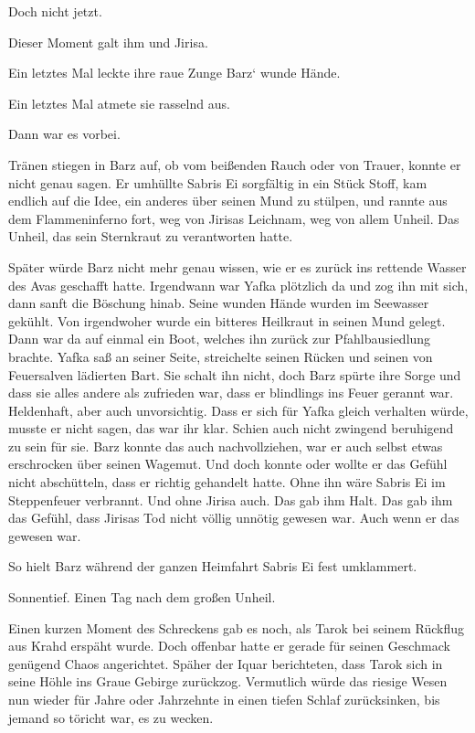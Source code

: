 Doch nicht jetzt.

Dieser Moment galt ihm und Jirisa.

Ein letztes Mal leckte ihre raue Zunge Barz‘ wunde Hände.

Ein letztes Mal atmete sie rasselnd aus.

Dann war es vorbei.

Tränen stiegen in Barz auf, ob vom beißenden Rauch oder von Trauer, konnte er nicht genau sagen. Er umhüllte Sabris Ei sorgfältig in ein Stück Stoff, kam endlich auf die Idee, ein anderes über seinen Mund zu stülpen, und rannte aus dem Flammeninferno fort, weg von Jirisas Leichnam, weg von allem Unheil. Das Unheil, das sein Sternkraut zu verantworten hatte.

Später würde Barz nicht mehr genau wissen, wie er es zurück ins rettende Wasser des Avas geschafft hatte. Irgendwann war Yafka plötzlich da und zog ihn mit sich, dann sanft die Böschung hinab. Seine wunden Hände wurden im Seewasser gekühlt. Von irgendwoher wurde ein bitteres Heilkraut in seinen Mund gelegt. Dann war da auf einmal ein Boot, welches ihn zurück zur Pfahlbausiedlung brachte. Yafka saß an seiner Seite, streichelte seinen Rücken und seinen von Feuersalven lädierten Bart. Sie schalt ihn nicht, doch Barz spürte ihre Sorge und dass sie alles andere als zufrieden war, dass er blindlings ins Feuer gerannt war. Heldenhaft, aber auch unvorsichtig. Dass er sich für Yafka gleich verhalten würde, musste er nicht sagen, das war ihr klar. Schien auch nicht zwingend beruhigend zu sein für sie. Barz konnte das auch nachvollziehen, war er auch selbst etwas erschrocken über seinen Wagemut. Und doch konnte oder wollte er das Gefühl nicht abschütteln, dass er richtig gehandelt hatte. Ohne ihn wäre Sabris Ei im Steppenfeuer verbrannt. Und ohne Jirisa auch. Das gab ihm Halt. Das gab ihm das Gefühl, dass Jirisas Tod nicht völlig unnötig gewesen war. Auch wenn er das gewesen war.

So hielt Barz während der ganzen Heimfahrt Sabris Ei fest umklammert.\bigskip







Sonnentief. Einen Tag nach dem großen Unheil.\bigskip



Einen kurzen Moment des Schreckens gab es noch, als Tarok bei seinem Rückflug aus Krahd erspäht wurde. Doch offenbar hatte er gerade für seinen Geschmack genügend Chaos angerichtet. Späher der Iquar berichteten, dass Tarok sich in seine Höhle ins Graue Gebirge zurückzog. Vermutlich würde das riesige Wesen nun wieder für Jahre oder Jahrzehnte in einen tiefen Schlaf zurücksinken, bis jemand so töricht war, es zu wecken.

